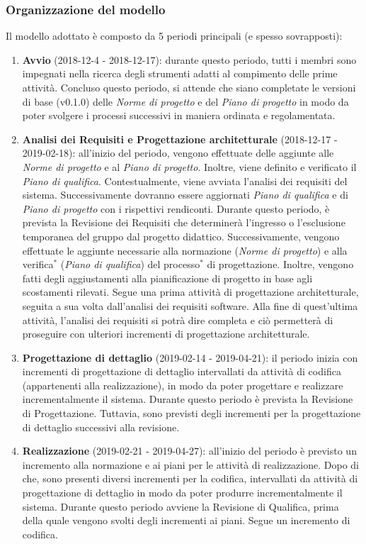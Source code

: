 \subsubsection{Organizzazione del modello}
Il modello adottato è composto da 5 periodi principali (e spesso sovrapposti):
\begin{enumerate}
	\item \textbf{Avvio} (2018-12-4 - 2018-12-17): durante questo periodo, tutti i membri sono impegnati nella ricerca degli strumenti adatti al compimento delle prime attività. Concluso questo periodo, si attende che siano completate le versioni di base (v0.1.0) delle \textit{Norme di progetto} e del \emph{Piano di progetto} in modo da poter svolgere i processi successivi in maniera ordinata e regolamentata.
	\item \textbf{Analisi dei Requisiti e Progettazione architetturale} (2018-12-17 - 2019-02-18): all'inizio del periodo, vengono effettuate delle aggiunte alle \textit{Norme di progetto} e al \textit{Piano di progetto}. Inoltre, viene definito e verificato il \textit{Piano di qualifica}. Contestualmente, viene avviata l'analisi dei requisiti del sistema. Successivamente dovranno essere aggiornati \textit{Piano di qualifica} e di \textit{Piano di progetto} con i rispettivi rendiconti. Durante questo periodo, è prevista la Revisione dei Requisiti che determinerà l'ingresso o l'esclusione temporanea del gruppo dal progetto didattico. Successivamente, vengono effettuate le aggiunte necessarie alla normazione (\textit{Norme di progetto}) e alla verifica$^*$ (\textit{Piano di qualifica}) del processo$^*$ di progettazione. Inoltre, vengono fatti degli aggiustamenti alla pianificazione di progetto in base agli scostamenti rilevati. Segue una prima attività di progettazione architetturale, seguita a sua volta dall'analisi dei requisiti software. Alla fine di quest'ultima attività, l'analisi dei requisiti si potrà dire completa e ciò permetterà di proseguire con ulteriori incrementi di progettazione architetturale. 
\item \textbf{Progettazione di dettaglio} (2019-02-14 - 2019-04-21): il periodo inizia con incrementi di progettazione di dettaglio intervallati da attività di codifica (appartenenti alla realizzazione), in modo da poter progettare e realizzare incrementalmente il sistema. Durante questo periodo è prevista la Revisione di Progettazione. Tuttavia, sono previsti degli incrementi per la progettazione di dettaglio successivi alla revisione.
	\item \textbf{Realizzazione} (2019-02-21 - 2019-04-27): all'inizio del periodo è previsto un incremento alla normazione e ai piani per le attività di realizzazione. Dopo di che, sono presenti diversi incrementi per la codifica, intervallati da attività di progettazione di dettaglio in modo da poter produrre incrementalmente il sistema. Durante questo periodo avviene la Revisione di Qualifica, prima della quale vengono svolti degli incrementi ai piani. Segue un incremento di codifica.

\end{enumerate}
